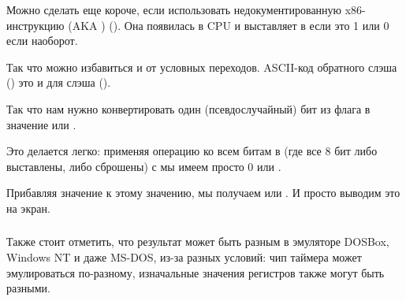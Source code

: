 Можно сделать еще короче, если использовать недокументированную x86-инструкцию  (\ac{AKA} ) ().
Она появилась в \ac{CPU} и выставляет  в 
 если  это 1 или 0 если наоборот.



Так что можно избавиться и от условных переходов.
\ac{ASCII}-код обратного слэша (\q{\textbackslash{}}) 
это  и  для слэша (\q{/}).

Так что нам нужно конвертировать один (псевдослучайный) бит из флага  в значение  или .

%
Это делается легко: применяя операцию  ко всем битам в  (где все 8 бит либо выставлены, либо сброшены) с  мы имеем просто 0 или .

%
Прибавляя значение  к этому значению, мы получаем  или .
И просто выводим это на экран.

\subsubsection{\Conclusion{}}

Также стоит отметить, что результат может быть разным в эмуляторе DOSBox, \gls{Windows NT} и даже MS-DOS, 
из-за разных условий:
чип таймера может эмулироваться по-разному, изначальные значения регистров также могут быть разными.
